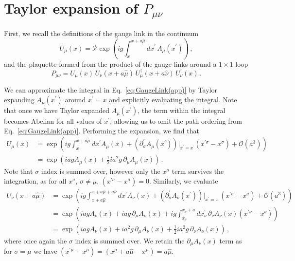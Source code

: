 \chapter{Taylor expansion of $P_{\mu\nu}$}\label{app:TEPlaquette}
First, we recall the definitions of the gauge link in the continuum
%
\begin{equation}
U_\mu(x) = \mathcal{P}\exp\left(ig\int_x^{x+a\hat{\mu}}dx^\prime \, A_\mu(x^\prime)\right)  \, ,
\label{eq:GaugeLink(app)}
\end{equation}
%
and the plaquette formed from the product of the gauge links around a $1\times 1$ loop
\begin{equation}
P_{\mu\nu} = U_\mu(x)\,U_\nu(x+a\hat{\mu})\,U^\dagger_\mu(x+a\hat{\nu})\,U^\dagger_\nu(x)\, .
\label{eq:Plaquette(app)}
\end{equation} 

We can approximate the integral in Eq.~\ref{eq:GaugeLink(app)} by Taylor expanding $A_\mu(x^\prime)$ around $x^\prime=x$ and explicitly evaluating the integral. Note that once we have Taylor expanded $A_\mu(x^\prime)$, the term within the integral becomes Abelian for all values of $x^\prime$, allowing us to omit the path ordering from Eq.~\ref{eq:GaugeLink(app)}. Performing the expansion, we find that
%
\begin{align}
U_\mu(x)&=\exp\left(ig\int_x^{x+a\hat{\mu}} dx^\prime A_\mu\left(x\right) + \left(\partial^\prime_\sigma A_\mu(x^\prime)\right)\big|_{x^\prime = x}\,(x^{\prime\sigma} - x^\sigma) + \mathcal{O}(a^3)\right)\nonumber\\
&=\exp\left(iag A_\mu\left(x\right) + \frac{1}{2}ia^2 g\, \partial_\mu A_\mu\left(x\right)\right)\, . \label{eq:UTaylor}
\end{align}
%
Note that $\sigma$ index is summed over, however only the $x^\mu$ term survives the integration, as for all $x^\sigma$, $\sigma\neq \mu$, $(x^{\prime\sigma}-x^\sigma)=0$. Similarly, we evaluate
%
\begin{align}
U_\nu(x+a\hat{\mu}) &= \exp\left(ig\int_{x+a\hat{\mu}}^{x+a\hat{\mu}+a\hat{\nu}} dx^\prime A_\nu\left(x\right) + \left(\partial^\prime_\sigma A_\nu(x^\prime)\right)\big|_{x^\prime = x}\,(x^{\prime\sigma} - x^\sigma) + \mathcal{O}(a^3)\right)\nonumber\\
&= \exp\left( iag A_\nu(x) + iag\,\partial_\mu A_\nu (x) + ig\int_{x_\nu}^{x_\nu+a} dx^\prime_\nu \, \partial_\nu A_\nu (x) (x^{\prime\nu} - x^\nu)\right)\nonumber\\
&= \exp\left(iag A_\nu(x) + ia^2g\,\partial_\mu A_\nu(x) + \frac{1}{2}ia^2 g\,\partial_\nu A_\nu(x)\right)\, ,\label{eq:UTaylor2}
\end{align}
%
where once again the $\sigma$ index is summed over. We retain the $\partial_\mu A_\nu (x)$ term as for $\sigma = \mu$ we have $(x^{\prime\mu} - x^\mu) = (x^\mu + a\hat{\mu} - x^\mu) = a\hat{\mu}$.\\

